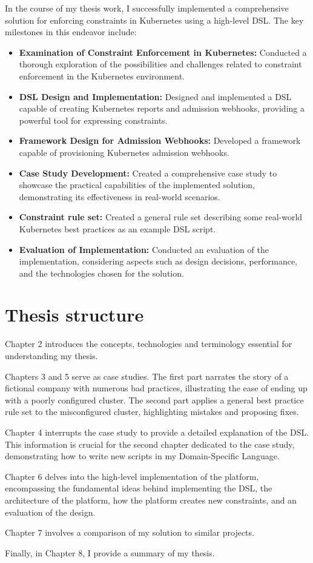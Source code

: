In the course of my thesis work, I successfully implemented a comprehensive solution for enforcing constraints in Kubernetes using a high-level DSL. The key milestones in this endeavor include:

\begin{itemize}
    \item \textbf{Examination of Constraint Enforcement in Kubernetes:} Conducted a thorough exploration of the possibilities and challenges related to constraint enforcement in the Kubernetes environment.
    \item \textbf{DSL Design and Implementation:} Designed and implemented a DSL capable of creating Kubernetes reports and admission webhooks, providing a powerful tool for expressing constraints.
    \item \textbf{Framework Design for Admission Webhooks:} Developed a framework capable of provisioning Kubernetes admission webhooks.
    \item \textbf{Case Study Development:} Created a comprehensive case study to showcase the practical capabilities of the implemented solution, demonstrating its effectiveness in real-world scenarios.
    \item \textbf{Constraint rule set:} Created a general rule set describing some real-world Kubernetes best practices as an example DSL script.
    \item \textbf{Evaluation of Implementation:} Conducted an evaluation of the implementation, considering aspects such as design decisions, performance, and the technologies chosen for the solution.
\end{itemize}

\section{Thesis structure}

Chapter 2 introduces the concepts, technologies and terminology essential for understanding my thesis.

Chapters 3 and 5 serve as case studies. The first part narrates the story of a fictional company with numerous bad practices, illustrating the ease of ending up with a poorly configured cluster. The second part applies a general best practice rule set to the misconfigured cluster, highlighting mistakes and proposing fixes.

Chapter 4 interrupts the case study to provide a detailed explanation of the DSL. This information is crucial for the second chapter dedicated to the case study, demonstrating how to write new scripts in my Domain-Specific Language.

Chapter 6 delves into the high-level implementation of the platform, encompassing the fundamental ideas behind implementing the DSL, the architecture of the platform, how the platform creates new constraints, and an evaluation of the design.

Chapter 7 involves a comparison of my solution to similar projects.

Finally, in Chapter 8, I provide a summary of my thesis.
